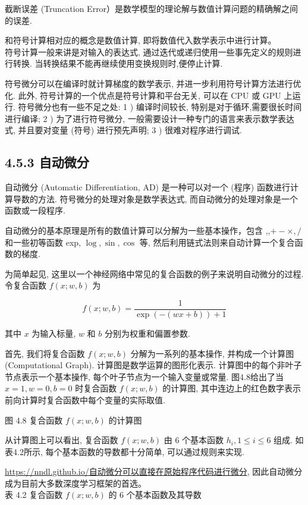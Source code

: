 \documentclass[10pt]{article}
\begin{document}
截断误差 (Truncation Error）是数学模型的理论解与数值计算问题的精确解之间的误差.

和符号计算相对应的概念是数值计算, 即将数值代入数学表示中进行计算。\\
符号计算一般来讲是对输入的表达式, 通过迭代或递归使用一些事先定义的规则进行转换. 当转换结果不能再继续使用变换规则时,便停止计算.

符号微分可以在编译时就计算梯度的数学表示, 并进一步利用符号计算方法进行优化. 此外, 符号计算的一个优点是符号计算和平台无关, 可以在 CPU 或 GPU 上运行. 符号微分也有一些不足之处: 1 ) 编译时间较长, 特别是对于循环,需要很长时间进行编译; 2 ) 为了进行符号微分, 一般需要设计一种专门的语言来表示数学表达式, 并且要对变量 (符号) 进行预先声明; 3 ) 很难对程序进行调试.

\subsection*{4.5.3 自动微分}
自动微分 (Automatic Differentiation, AD) 是一种可以对一个 (程序) 函数进行计算导数的方法. 符号微分的处理对象是数学表达式, 而自动微分的处理对象是一个函数或一段程序.

自动微分的基本原理是所有的数值计算可以分解为一些基本操作，包含 ,,$+- \times, /$ 和一些初等函数 exp, $\log , \sin , \cos$ 等, 然后利用链式法则来自动计算一个复合函数的梯度.

为简单起见, 这里以一个神经网络中常见的复合函数的例子来说明自动微分的过程. 令复合函数 $f(x ; w, b)$ 为


\begin{equation*}
f(x ; w, b)=\frac{1}{\exp (-(w x+b))+1} \tag{4.74}
\end{equation*}


其中 $x$ 为输入标量, $w$ 和 $b$ 分别为权重和偏置参数.

首先, 我们将复合函数 $f(x ; w, b)$ 分解为一系列的基本操作, 并构成一个计算图 (Computational Graph). 计算图是数学运算的图形化表示. 计算图中的每个非叶子节点表示一个基本操作, 每个叶子节点为一个输入变量或常量. 图4.8给出了当 $x=1, w=0, b=0$ 时复合函数 $f(x ; w, b)$ 的计算图, 其中连边上的红色数字表示前向计算时复合函数中每个变量的实际取值.



图 4.8 复合函数 $f(x ; w, b)$ 的计算图

从计算图上可以看出, 复合函数 $f(x ; w, b)$ 由 6 个基本函数 $h_{i}, 1 \leq i \leq 6$ 组成. 如表4.2所示, 每个基本函数的导数都十分简单, 可以通过规则来实现.

\href{https://nndl.github.io/%E8%87%AA%E5%8A%A8%E5%BE%AE%E5%88%86%E5%8F%AF%E4%BB%A5%E7%9B%B4%E6%8E%A5%E5%9C%A8%E5%8E%9F%E5%A7%8B%E7%A8%8B%E5%BA%8F%E4%BB%A3%E7%A0%81%E8%BF%9B%E8%A1%8C%E5%BE%AE%E5%88%86}{https://nndl.github.io/自动微分可以直接在原始程序代码进行微分}, 因此自动微分成为目前大多数深度学习框架的首选。\\
表 4.2 复合函数 $f(x ; w, b)$ 的 6 个基本函数及其导数
\end{document}
